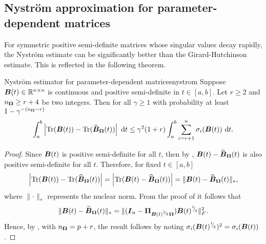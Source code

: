 \documentclass[12pt]{article}
\begin{document}
\subsection{Nyström approximation for parameter-dependent matrices}
\label{subsec:nystrom}

For symmetric positive semi-definite matrices whose singular values decay rapidly, the Nyström estimate  can be significantly better than the Girard-Hutchinson estimate. This is reflected in the following theorem.

\begin{theorem}{Nyström estimator for parameter-dependent matrices}{nystrom}
    Suppose $\boldsymbol{B}(t) \in \mathbb{R}^{n \times n}$ is continuous and positive semi-definite in $t \in [a, b]$. Let $r \geq 2$ and $n_{\boldsymbol{\Omega}} \geq r + 4$ be two integers. Then for all $\gamma \geq 1$ with probability at least $1 - \gamma^{-(n_{\boldsymbol{\Omega}} - r)}$
    \begin{equation}
        \int_{a}^{b} \left| \operatorname{Tr}(\boldsymbol{B}(t)) - \operatorname{Tr}(\widehat{\boldsymbol{B}}_{\boldsymbol{\Omega}}(t)) \right| ~\mathrm{d}t
        \leq \gamma^2 (1 + r) \int_{a}^{b} \sum_{i = r+1}^{n} \sigma_i(\boldsymbol{B}(t)) ~\mathrm{d}t.
    \end{equation}
\end{theorem}

\begin{proof}
    Since $\boldsymbol{B}(t)$ is positive semi-definite for all $t$, then by \cite[lemma 2.1]{frangella-2023-randomized-nystrom}, $\boldsymbol{B}(t) - \widehat{\boldsymbol{B}}_{\boldsymbol{\Omega}}(t)$ is also positive semi-definite for all $t$. Therefore, for fixed $t \in [a, b]$
    \begin{equation}
        \left| \operatorname{Tr}(\boldsymbol{B}(t)) - \operatorname{Tr}(\widehat{\boldsymbol{B}}_{\boldsymbol{\Omega}}(t)) \right|
        = \left| \operatorname{Tr}(\boldsymbol{B}(t) - \widehat{\boldsymbol{B}}_{\boldsymbol{\Omega}}(t)) \right|
        = \lVert \boldsymbol{B}(t) - \widehat{\boldsymbol{B}}_{\boldsymbol{\Omega}}(t) \rVert _{\ast},
    \end{equation}
    where $\lVert \cdot \rVert _{\ast}$ represents the nuclear norm.  From the proof of \cite[corollary 8.2]{tropp-2023-randomized-algorithms} it follows that
    \begin{equation}
        \lVert \boldsymbol{B}(t) - \widehat{\boldsymbol{B}}_{\boldsymbol{\Omega}}(t) \rVert _{\ast} = \lVert (\boldsymbol{I}_n - \boldsymbol{\Pi}_{\boldsymbol{B}(t)^{{}^{1}{\mskip -5mu/\mskip -3mu}_{2}} \boldsymbol{\Omega}}) \boldsymbol{B}(t)^{{}^{1}{\mskip -5mu/\mskip -3mu}_{2}} \rVert _F^2.
    \end{equation}
    Hence, by \cite[theorem 9]{kressner-2023-randomized-lowrank}, with $n_{\boldsymbol{\Omega}} = p + r$, the result follows by noting $\sigma_i(\boldsymbol{B}(t)^{{}^{1}{\mskip -5mu/\mskip -3mu}_{2}})^{2} = \sigma_i(\boldsymbol{B}(t))$.
\end{proof}
\end{document}
